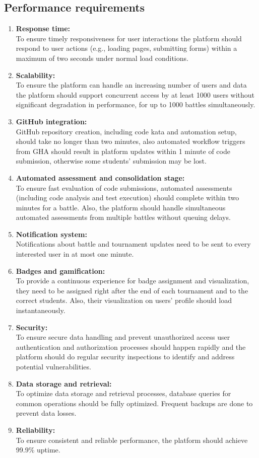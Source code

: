 \subsection{Performance requirements}
\begin{enumerate}
  \item \textbf{Response time:} \\
  To ensure timely responsiveness for user interactions the platform should respond to user actions (e.g., loading pages, submitting forms) within a maximum of two seconds under normal load conditions.
  \item \textbf{Scalability:} \\
  To ensure the platform can handle an increasing number of users and data the platform should support concurrent access by at least 1000 users without significant degradation in performance, for up to 1000 battles simultaneously.
  \item \textbf{GitHub integration:} \\
  GitHub repository creation, including code kata and automation setup, should take no longer than two minutes, also automated workflow triggers from GHA should result in platform updates within 1 minute of code submission, otherwise some students’ submission may be lost.
  \item \textbf{Automated assessment and consolidation stage:} \\
  To ensure fast evaluation of code submissions, automated assessments (including code analysis and test execution) should complete within two minutes for a battle. Also, the platform should handle simultaneous automated assessments from multiple battles without queuing delays.
  \item \textbf{Notification system:} \\
  Notifications about battle and tournament updates need to be sent to every interested user in at most one minute.
  \item \textbf{Badges and gamification:} \\
  To provide a continuous experience for badge assignment and visualization, they need to be assigned right after the end of each tournament and to the correct students. Also, their visualization on users’ profile should load instantaneously.
  \item \textbf{Security:} \\
  To ensure secure data handling and prevent unauthorized access user authentication and authorization processes should happen rapidly and the platform should do regular security inspections to identify and address potential vulnerabilities.
  \item \textbf{Data storage and retrieval:} \\
  To optimize data storage and retrieval processes, database queries for common operations should be fully optimized. Frequent backups are done to prevent data losses.
  \item \textbf{Reliability:} \\
  To ensure consistent and reliable performance, the platform should achieve 99.9\% uptime.
\end{enumerate}

